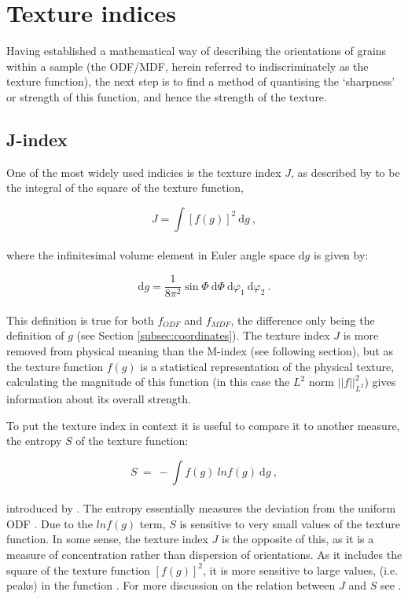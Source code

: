 \documentclass[a4paper,12pt,twoside]{report}
\numberwithin{equation}{chapter}
\begin{document}
\section{Texture indices} \label{sec:indicies}
Having established a mathematical way of describing the orientations of grains within a sample (the ODF/MDF, herein referred to indiscriminately as the texture function), the next step is to find a method of quantising the \lq{}sharpness\rq{} or strength of this function, and hence the strength of the texture.

\subsection{J-index} \label{subsec:j-index}
 One of the most widely used indicies is the texture index $J$, as described by \cite{bunge1982texture} to be the integral of the square of the texture function,

\begin{equation}
J = \int [ f(g) ]^2\ \mathrm{d}g \ ,
\end{equation} 
\\
where the infinitesimal volume element in Euler angle space $\mathrm{d}g$ is given by:

\begin{equation}
\mathrm{d}g = \frac{1}{8\pi^2} \sin\Phi\ \mathrm{d}\Phi\ \mathrm{d}\varphi_1\ \mathrm{d}\varphi_2\ .
\end{equation} 
\\
This definition is true for both $f_{ODF}$ and $f_{MDF}$, the difference only being the definition of $g$ (see Section \ref{subsec:coordinates}). The texture index $J$ is more removed from physical meaning than the M-index (see following section), but as the texture function $f(g)$ is a statistical representation of the physical texture, calculating the magnitude of this function (in this case the $L^2$ norm $||f||^2_{L^2}$) gives information about its overall strength.

To put the texture index in context it is useful to compare it to another measure, the entropy $S$ of the texture function:

\begin{equation}
S\ =\ -\int f(g)\ ln f(g)\ \mathrm{d}g\ ,
\end{equation}
\\
introduced by \cite{Schaeben1988}. The entropy essentially measures the deviation from the uniform ODF \citep[lack of \lq{}organisation\rq{} of orientations,][]{Hielscher2007}. Due to the $ln f(g)$ term, $S$ is sensitive to very small values of the texture function. In some sense, the texture index $J$ is the opposite of this, as it is a measure of concentration rather than dispersion of orientations. As it includes the square of the texture function $[f(g)]^2$, it is more sensitive to large values, (i.e. peaks) in the function \citep{Mainprice}. For more discussion on the relation between $J$ and $S$ see \cite{Hielscher2007}. 
\end{document}
